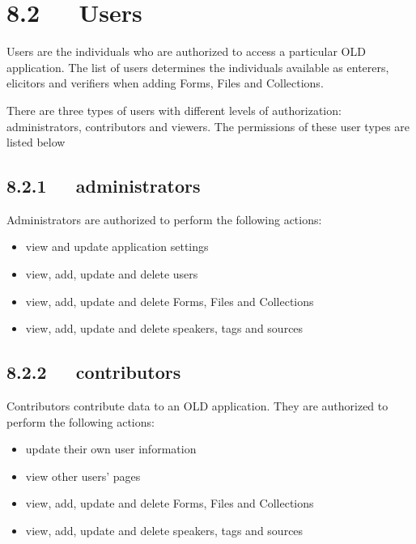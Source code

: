 \documentclass[letterpaper,10pt,english]{sphinxmanual}
\begin{document}
\section{8.2   Users}
\label{documentation:users}
Users are the individuals who are authorized to access a particular OLD
application.  The list of users determines the individuals available as
enterers, elicitors and verifiers when adding Forms, Files and Collections.

There are three types of users with different levels of authorization:
administrators, contributors and viewers.  The permissions of these user types
are listed below


\subsection{8.2.1   administrators}
\label{documentation:administrators}
Administrators are authorized to perform the following actions:
\begin{itemize}
\item {} 
view and update application settings

\item {} 
view, add, update and delete users

\item {} 
view, add, update and delete Forms, Files and Collections

\item {} 
view, add, update and delete speakers, tags and sources

\end{itemize}


\subsection{8.2.2   contributors}
\label{documentation:contributors}
Contributors contribute data to an OLD application.  They are authorized to
perform the following actions:
\begin{itemize}
\item {} 
update their own user information

\item {} 
view other users' pages

\item {} 
view, add, update and delete Forms, Files and Collections

\item {} 
view, add, update and delete speakers, tags and sources

\end{itemize}
\end{document}
